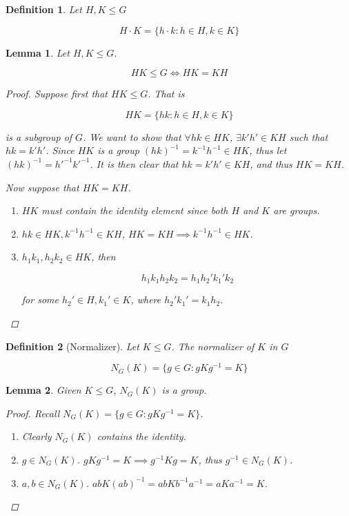 \documentclass{article}
\newtheorem{lemma}{Lemma}
\newtheorem{mdef}{Definition}
\begin{document}
\begin{mdef}
  Let $H, K \leq G$

  \[H \cdot K = \{h \cdot k : h \in H, k \in K\}\]
\end{mdef}

\begin{lemma}
  Let $H, K \leq G$.

  \[HK \leq G \iff HK = KH\]

  \begin{proof}
    Suppose first that $HK \leq G$. That is

    \[HK = \{hk : h \in H, k \in K\}\]

    is a subgroup of $G$. We want to show that $\forall hk \in HK$, $\exists k'h' \in KH$ such that $hk = k'h'$. Since $HK$ is a group $(hk)^{-1} = k^{-1} h^{-1} \in HK$, thus let $(hk)^{-1} = {h'}^{-1} {k'}^{-1}$. It is then clear that $hk = k'h' \in KH$, and thus $HK = KH$.

    Now suppose that $HK = KH$.

    \begin{enumerate}
    \item $HK$ must contain the identity element since both $H$ and $K$ are groups.
    \item $hk \in HK, k^{-1} h^{-1} \in KH$, $HK = KH \implies k^{-1} h^{-1} \in HK$.
    \item $h_1 k_1, h_2 k_2 \in HK$, then

      \[h_1 k_1 h_2 k_2 = h_1 h_2' k_1' k_2\]

      for some $h_2' \in H, k_1' \in K$, where $h_2' k_1' = k_1 h_2$.
    \end{enumerate}
  \end{proof}
\end{lemma}

\begin{mdef}[Normalizer]
  Let $K \leq G$. The normalizer of $K$ in $G$

  \[N_G(K) = \{g \in G : gKg^{-1} = K\}\]
\end{mdef}

\begin{lemma}
  Given $K \leq G$, $N_G(K)$ is a group.

  \begin{proof}
    Recall $N_G(K) = \{g \in G : gKg^{-1} = K\}$.

    \begin{enumerate}
    \item Clearly $N_G(K)$ contains the identity.
    \item $g \in N_G(K)$. $gKg^{-1} = K \implies g^{-1} K g = K$, thus $g^{-1} \in N_G(K)$.
    \item $a, b \in N_G(K)$. $abK(ab)^{-1} = abKb^{-1}a^{-1} = aKa^{-1} = K$.
    \end{enumerate}
  \end{proof}
\end{lemma}
\end{document}
